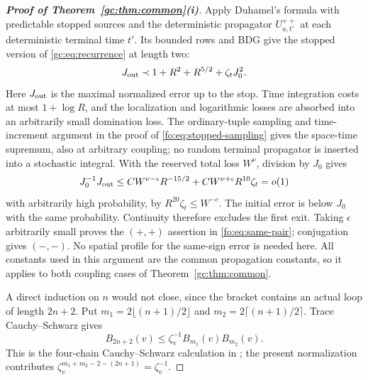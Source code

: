 \documentclass[11pt]{article}
\numberwithin{equation}{section}
\theoremstyle{remark}
\begin{document}
\begin{proof}[\textbf{Proof of Theorem~\ref{gc:thm:common}(i)}]
Apply Duhamel's formula with predictable stopped sources and the
deterministic propagator $U_{u,t'}^{++}$ at each deterministic terminal
time $t'$. Its bounded rows and BDG give the stopped version of
\eqref{gc:eq:recurrence} at length two:
\begin{equation}\label{gc:eq:same-pair-stop}
 J_{\rm out}\prec 1+R^2+R^{5/2}+\zeta_t J_0^2.
\end{equation}
Here $J_{\rm out}$ is the maximal normalized error up to the stop.
Time integration costs at most $1+\log R$, and the localization and
logarithmic losses are absorbed into an arbitrarily small domination
loss. The ordinary-tuple sampling and time-increment argument in the proof
of \eqref{fo:eq:stopped-sampling} gives the space-time supremum, also at
arbitrary coupling; no random terminal propagator is inserted into a
stochastic integral.
With the reserved total loss $W^\nu$, division by $J_0$ gives
\[
 J_0^{-1} J_{\rm out}
 \le C W^{\nu-\epsilon}R^{-15/2}
       +C W^{\nu+\epsilon}R^{10}\zeta_t=o(1)
\]
with arbitrarily high probability, by $R^{20}\zeta_t\le W^{-c}$.
The initial error is below $J_0$ with the same probability.
Continuity therefore excludes the first exit. Taking $\epsilon$
arbitrarily small proves the $(+,+)$ assertion in
\eqref{fo:eq:same-pair}; conjugation gives $(-,-)$.
No spatial profile for the same-sign error is needed here.
All constants used in this argument are the common propagation
constants, so it applies to both coupling cases of
Theorem~\ref{gc:thm:common}.

A direct induction on $n$ would not close, since the bracket contains
an actual loop of length $2n+2$. Put
$m_1=2\lfloor(n+1)/2\rfloor$ and
$m_2=2\lceil(n+1)/2\rceil$. Trace Cauchy--Schwarz gives
\begin{equation}\label{gc:eq:chain}
 B_{2n+2}(v)\le\zeta_v^{-1}B_{m_1}(v)B_{m_2}(v).
\end{equation}
This is the four-chain Cauchy--Schwarz calculation in
\cite[(A.74)--(A.77)]{TYY}; the present normalization contributes
$\zeta_v^{m_1+m_2-2-(2n+1)}=\zeta_v^{-1}$.


\end{proof}
\end{document}

